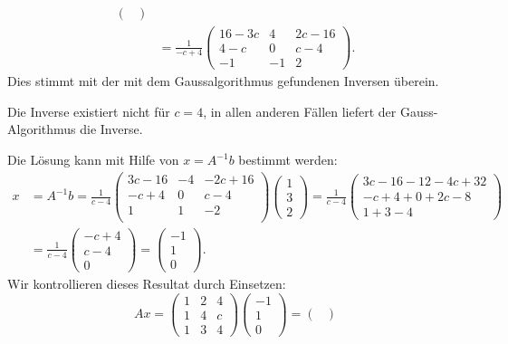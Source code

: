 \begin{loesung}
\begin{teilaufgaben}
\begin{align*}
\begin{pmatrix}
\end{pmatrix}
\\
&=
\frac1{-c+4}
\begin{pmatrix}
   16-3c&      4&  2c-16\\
     4-c&      0&    c-4\\
      -1&     -1&      2
\end{pmatrix}.
\end{align*}
Dies stimmt mit der mit dem Gaussalgorithmus gefundenen Inversen überein.
\item
Die Inverse existiert nicht für $c=4$, in allen anderen Fällen
liefert der Gauss-Algorithmus die Inverse.
\item
Die Lösung kann mit Hilfe von $x=A^{-1}b$ bestimmt werden:
\begin{align*}
x&=
A^{-1}b=
\frac{1}{c-4}
\begin{pmatrix}
3c-16&-4& -2c+16\\
-c+ 4& 0&   c- 4\\
    1& 1&    - 2\\
\end{pmatrix}
\begin{pmatrix}1\\3\\2\end{pmatrix}
=
\frac{1}{c-4}
\begin{pmatrix}
3c-16-12-4c+32\\
-c+4+0+2c-8\\
1+3-4
\end{pmatrix}
\\
&=
\frac{1}{c-4}
\begin{pmatrix}
-c+4\\
c-4\\
0
\end{pmatrix}
=\begin{pmatrix}
-1\\1\\0
\end{pmatrix}.
\end{align*}
Wir kontrollieren dieses Resultat durch Einsetzen:
\[
Ax=
\begin{pmatrix}
1&2&4\\
1&4&c\\
1&3&4
\end{pmatrix}
\begin{pmatrix}
-1\\1\\0
\end{pmatrix}
=
\begin{pmatrix}

\end{pmatrix}\]
\end{teilaufgaben}
\end{loesung}
